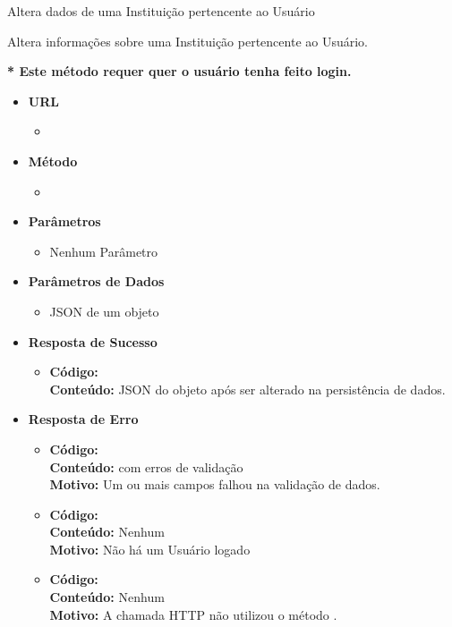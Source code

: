 \begin{caixa}{Altera dados de uma Instituição pertencente ao Usuário}{}

Altera informações sobre uma Instituição pertencente ao Usuário.

\textbf{* Este método requer quer o usuário tenha feito login.}

\begin{itemize}
\item \textbf{URL}
	\begin{itemize}
		\item {}
	\end{itemize}

\item \textbf{Método}
	\begin{itemize}
		\item {}
	\end{itemize}

\item \textbf{Parâmetros}
	\begin{itemize}
        \item Nenhum Parâmetro
	\end{itemize}

\item \textbf{Parâmetros de Dados}
	\begin{itemize}
		\item JSON de um objeto 
	\end{itemize}

\item \textbf{Resposta de Sucesso}
	\begin{itemize}
		\item \textbf{Código:}  \\ \textbf{Conteúdo:} JSON do objeto  após ser alterado na persistência de dados.
	\end{itemize}

\item \textbf{Resposta de Erro}
	\begin{itemize}
    	\item \textbf{Código:}  \\ \textbf{Conteúdo:}  com erros de validação \\ \textbf{Motivo:} Um ou mais campos falhou na validação de dados.
		\item \textbf{Código:}  \\ \textbf{Conteúdo:} Nenhum \\ \textbf{Motivo:} Não há um Usuário logado
        \item \textbf{Código:}  \\ \textbf{Conteúdo:} Nenhum \\ \textbf{Motivo:} A chamada HTTP não utilizou o método .
	\end{itemize}

\end{itemize}
\end{caixa}